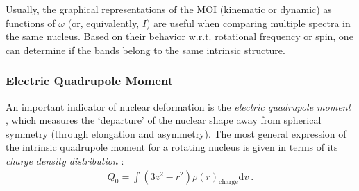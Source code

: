 Usually, the graphical representations of the MOI (kinematic or dynamic) as functions of $\omega$ (or, equivalently, $I$) are useful when comparing multiple spectra in the same nucleus. Based on their behavior w.r.t. rotational frequency or spin, one can determine if the bands belong to the same intrinsic structure.

\subsubsection{Electric Quadrupole Moment}
\label{intro-EM-chapter2}

An important indicator of nuclear deformation is the \emph{electric quadrupole moment} \cite{hamamoto2016interplay}, which measures the `departure' of the nuclear shape away from spherical symmetry (through elongation and asymmetry). The most general expression of the intrinsic quadrupole moment for a rotating nucleus is given in terms of its \emph{charge density distribution} \cite{casten2000nuclear}:
\begin{align}
    Q_0=\int(3z^2-r^2)\rho(r)_\text{charge}\text{d}v\ .
    \label{general-quadrupole-moment-Q0-charge}
\end{align}

